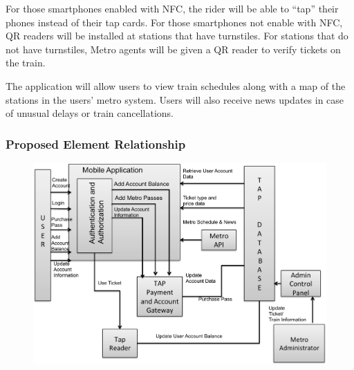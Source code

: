 		For those smartphones enabled with NFC, the rider will be able to “tap” their phones instead of their tap cards. For those smartphones not enable with NFC, QR readers will be installed at stations that have turnstiles. For stations that do not have turnstiles, Metro agents will be given a QR reader to verify tickets on the train.
		
	The application will allow users to view train schedules along with a map of the stations in the users’ metro system. Users will also receive news updates in case of unusual delays or train cancellations. 
	
\clearpage
	\subsubsection{Proposed Element Relationship}
		\begin{figure}[!htbp]
			\centering
				\includegraphics[width=\textwidth]{OCD/element-relationship.pdf}
		\end{figure}			

\clearpage
